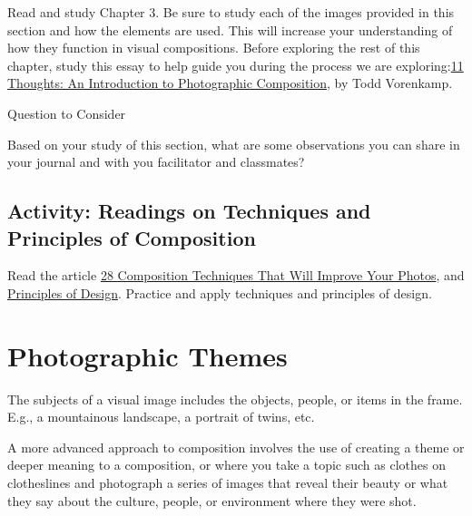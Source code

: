\documentclass[
]{book}
\begin{document}
\begin{reflect}
Read and study Chapter 3. Be sure to study each of the images provided in this section and how the elements are used. This will increase your understanding of how they function in visual compositions.
Before exploring the rest of this chapter, study this essay to help guide you during the process we are exploring:\href{https://www.bhphotovideo.com/explora/photography/tips-and-solutions/11-thoughts-introduction-photographic-composition}{11 Thoughts: An Introduction to Photographic Composition}, by Todd Vorenkamp.

{Question to Consider}

Based on your study of this section, what are some observations you can share in your journal and with you facilitator and classmates?
\end{reflect}

\hypertarget{activity-readings-on-techniques-and-principles-of-composition}{%
\subsection*{Activity: Readings on Techniques and Principles of Composition}\label{activity-readings-on-techniques-and-principles-of-composition}}

\begin{reflect}
Read the article \href{https://petapixel.com/photography-composition-techniques/}{28 Composition Techniques That Will Improve Your Photos}, and \href{https://www.getty.edu/education/teachers/building_lessons/principles_design.pdf}{Principles of Design}. Practice and apply techniques and principles of design.
\end{reflect}

\hypertarget{photographic-themes}{%
\section{Photographic Themes}\label{photographic-themes}}

The subjects of a visual image includes the objects, people, or items in the frame. E.g., a mountainous landscape, a portrait of twins, etc.

A more advanced approach to composition involves the use of creating a theme or deeper meaning to a composition, or where you take a topic such as clothes on clotheslines and photograph a series of images that reveal their beauty or what they say about the culture, people, or environment where they were shot.
\end{document}
